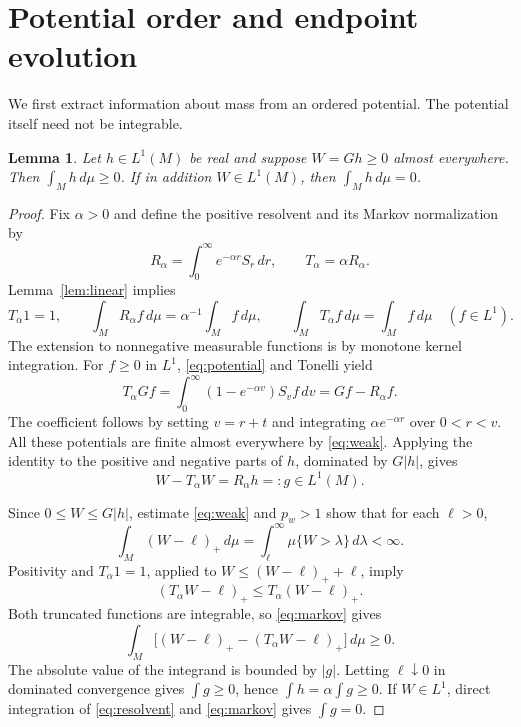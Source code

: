 \documentclass[11pt]{article}
\newtheorem{lemma}[theorem]{Lemma}
\theoremstyle{definition}
\theoremstyle{remark}
\newcommand{\dd}{\,d\mu}
\newcommand{\intM}{\int_M}
\begin{document}
\section{Potential order and endpoint evolution}\label{sec:order}

We first extract information about mass from an ordered potential.
The potential itself need not be integrable.

\begin{lemma}\label{lem:order}
Let \(h\in L^1(M)\) be real and suppose \(W=Gh\ge0\) almost
everywhere. Then \(\intM h\dd\ge0\).
If in addition \(W\in L^1(M)\), then \(\intM h\dd=0\).
\end{lemma}
\begin{proof}
Fix \(\alpha>0\) and define the positive resolvent and its
Markov normalization by
\[
 R_\alpha=\int_0^\infty e^{-\alpha r}S_r\,dr,\qquad
 T_\alpha=\alpha R_\alpha .
\]
Lemma~\ref{lem:linear} implies
\begin{equation}\label{eq:markov}
 T_\alpha1=1,\qquad
 \intM R_\alpha f\dd=\alpha^{-1}\intM f\dd,\qquad
 \intM T_\alpha f\dd=\intM f\dd\quad(f\in L^1).
\end{equation}
The extension to nonnegative measurable functions is by monotone
kernel integration.
For \(f\ge0\) in \(L^1\), \eqref{eq:potential} and Tonelli yield
\[
 T_\alpha Gf
 =\int_0^\infty(1-e^{-\alpha v})S_vf\,dv
 =Gf-R_\alpha f.
\]
The coefficient follows by setting \(v=r+t\) and integrating
\(\alpha e^{-\alpha r}\) over \(0<r<v\).
All these potentials are finite almost everywhere by
\eqref{eq:weak}. Applying the identity to the positive and
negative parts of \(h\), dominated by \(G|h|\), gives
\begin{equation}\label{eq:resolvent}
 W-T_\alpha W=R_\alpha h=:g\in L^1(M).
\end{equation}

Since \(0\le W\le G|h|\), estimate \eqref{eq:weak} and \(p_w>1\)
show that for each \(\ell>0\),
\[
 \intM(W-\ell)_+\dd
 =\int_\ell^\infty\mu\{W>\lambda\}\,d\lambda<\infty.
\]
Positivity and \(T_\alpha1=1\), applied to
\(W\le(W-\ell)_++\ell\), imply
\[
 (T_\alpha W-\ell)_+\le T_\alpha(W-\ell)_+ .
\]
Both truncated functions are integrable, so \eqref{eq:markov} gives
\[
 \intM\bigl[(W-\ell)_+-(T_\alpha W-\ell)_+\bigr]\dd\ge0.
\]
The absolute value of the integrand is bounded by \(|g|\).
Letting \(\ell\downarrow0\) in dominated convergence gives
\(\int g\ge0\), hence \(\int h=\alpha\int g\ge0\).
If \(W\in L^1\), direct integration of \eqref{eq:resolvent}
and \eqref{eq:markov} gives \(\int g=0\).
\end{proof}
\end{document}

